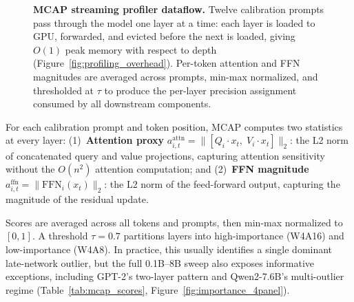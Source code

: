 \documentclass{article}
\begin{document}
\begin{figure}[H]
{%
}
\caption{\textbf{MCAP streaming profiler dataflow.} Twelve calibration prompts pass
through the model one layer at a time: each layer is loaded to GPU, forwarded, and
evicted before the next is loaded, giving $O(1)$ peak memory with respect to depth
(Figure~\ref{fig:profiling_overhead}). Per-token attention and FFN magnitudes are
averaged across prompts, min-max normalized, and thresholded at $\tau$ to produce the
per-layer precision assignment consumed by all downstream components.}
\label{fig:mcap_dataflow}
\end{figure}

For each calibration prompt and token position, MCAP computes two statistics at every layer:
(1)~\textbf{Attention proxy} $a_{i,t}^{\text{attn}} = \|[Q_i \cdot x_t,\; V_i \cdot x_t]\|_2$:
the L2 norm of concatenated query and value projections, capturing attention sensitivity
without the $O(n^2)$ attention computation; and
(2)~\textbf{FFN magnitude} $a_{i,t}^{\text{ffn}} = \|\text{FFN}_i(x_t)\|_2$:
the L2 norm of the feed-forward output, capturing the magnitude of the residual update.

Scores are averaged across all tokens and prompts, then min-max normalized to $[0, 1]$.
A threshold $\tau = 0.7$ partitions layers into high-importance (W4A16) and low-importance
(W4A8). In practice, this usually identifies a single dominant late-network outlier, but
the full 0.1B--8B sweep also exposes informative exceptions, including GPT-2's two-layer
pattern and Qwen2-7.6B's multi-outlier regime (Table~\ref{tab:mcap_scores},
Figure~\ref{fig:importance_4panel}).
\end{document}
